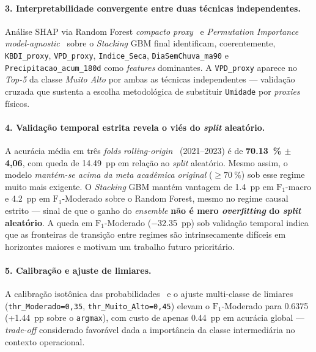 \paragraph{3. Interpretabilidade convergente entre duas técnicas independentes.} Análise SHAP via Random Forest \emph{compacto proxy}~\cite{lundberg2017unified,lundberg2020local} e \emph{Permutation Importance} \emph{model-agnostic}~\cite{breiman2001random,fisher2019all} sobre o \emph{Stacking} GBM final identificam, coerentemente, \texttt{KBDI\_proxy}, \texttt{VPD\_proxy}, \texttt{Indice\_Seca}, \texttt{DiaSemChuva\_ma90} e \texttt{Precipitacao\_acum\_180d} como \emph{features} dominantes. A \texttt{VPD\_proxy} aparece no \emph{Top-5} da classe \emph{Muito Alto} por ambas as técnicas independentes --- validação cruzada que sustenta a escolha metodológica de substituir \texttt{Umidade} por \emph{proxies} físicos.

\paragraph{4. Validação temporal estrita revela o viés do \emph{split} aleatório.} A acurácia média em três \emph{folds} \emph{rolling-origin}~\cite{bergmeir2012cv} (2021--2023) é de \textbf{\SI{70,13}{\percent} \(\pm\) 4,06}, com queda de \SI{14,49}{pp} em relação ao \emph{split} aleatório. Mesmo assim, o modelo \emph{mantém-se acima da meta acadêmica original} (\(\geq \SI{70}{\percent}\)) sob esse regime muito mais exigente. O \emph{Stacking} GBM mantém vantagem de \SI{+1,4}{pp} em \(\text{F}_1\)-macro e \SI{+4,2}{pp} em \(\text{F}_1\)-Moderado sobre o Random Forest, mesmo no regime causal estrito --- sinal de que o ganho do \emph{ensemble} \textbf{não é mero \emph{overfitting} do \emph{split} aleatório}. A queda em \(\text{F}_1\)-Moderado (\SI{-32,35}{pp}) sob validação temporal indica que as fronteiras de transição entre regimes são intrinsecamente difíceis em horizontes maiores e motivam um trabalho futuro prioritário.

\paragraph{5. Calibração e ajuste de limiares.} A calibração isotônica das probabilidades~\cite{zadrozny2002transforming} e o ajuste multi-classe de limiares (\texttt{thr\_Moderado=0,35}, \texttt{thr\_Muito\_Alto=0,45}) elevam o \(\text{F}_1\)-Moderado para \num{0,6375} (+\SI{1,44}{pp} sobre o \texttt{argmax}), com custo de apenas \SI{0,44}{pp} em acurácia global --- \emph{trade-off} considerado favorável dada a importância da classe intermediária no contexto operacional.

